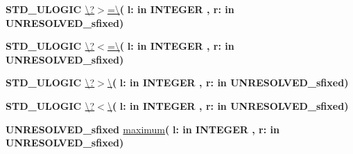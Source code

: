 \begin{DoxyCompactItemize}
\item 
{\bfseries {\bfseries \textcolor{comment}{S\+T\+D\+\_\+\+U\+L\+O\+G\+I\+C}\textcolor{vhdlchar}{ }}} \hyperlink{class__fixed__pkg_a3adee8c12e5c0bb76fc3e1a493284a27}{\textbackslash{}?$>$=\textbackslash{}}{\bfseries  ( }{\bfseries \textcolor{vhdlchar}{l\+: }\textcolor{stringliteral}{in }{\bfseries \textcolor{comment}{I\+N\+T\+E\+G\+E\+R}\textcolor{vhdlchar}{ }}}{\bfseries  , \textcolor{vhdlchar}{r\+: }\textcolor{stringliteral}{in }\textcolor{vhdlchar}{U\+N\+R\+E\+S\+O\+L\+V\+E\+D\+\_\+sfixed}}{\bfseries  )} 
\item 
{\bfseries {\bfseries \textcolor{comment}{S\+T\+D\+\_\+\+U\+L\+O\+G\+I\+C}\textcolor{vhdlchar}{ }}} \hyperlink{class__fixed__pkg_a271da29f659a2bc9480dbd29d7727913}{\textbackslash{}?$<$=\textbackslash{}}{\bfseries  ( }{\bfseries \textcolor{vhdlchar}{l\+: }\textcolor{stringliteral}{in }{\bfseries \textcolor{comment}{I\+N\+T\+E\+G\+E\+R}\textcolor{vhdlchar}{ }}}{\bfseries  , \textcolor{vhdlchar}{r\+: }\textcolor{stringliteral}{in }\textcolor{vhdlchar}{U\+N\+R\+E\+S\+O\+L\+V\+E\+D\+\_\+sfixed}}{\bfseries  )} 
\item 
{\bfseries {\bfseries \textcolor{comment}{S\+T\+D\+\_\+\+U\+L\+O\+G\+I\+C}\textcolor{vhdlchar}{ }}} \hyperlink{class__fixed__pkg_a9e6b6b8c2c14da978e6f70cb6e85e6dc}{\textbackslash{}?$>$\textbackslash{}}{\bfseries  ( }{\bfseries \textcolor{vhdlchar}{l\+: }\textcolor{stringliteral}{in }{\bfseries \textcolor{comment}{I\+N\+T\+E\+G\+E\+R}\textcolor{vhdlchar}{ }}}{\bfseries  , \textcolor{vhdlchar}{r\+: }\textcolor{stringliteral}{in }\textcolor{vhdlchar}{U\+N\+R\+E\+S\+O\+L\+V\+E\+D\+\_\+sfixed}}{\bfseries  )} 
\item 
{\bfseries {\bfseries \textcolor{comment}{S\+T\+D\+\_\+\+U\+L\+O\+G\+I\+C}\textcolor{vhdlchar}{ }}} \hyperlink{class__fixed__pkg_a7e98e66a4a282c529968f69f70dd16ad}{\textbackslash{}?$<$\textbackslash{}}{\bfseries  ( }{\bfseries \textcolor{vhdlchar}{l\+: }\textcolor{stringliteral}{in }{\bfseries \textcolor{comment}{I\+N\+T\+E\+G\+E\+R}\textcolor{vhdlchar}{ }}}{\bfseries  , \textcolor{vhdlchar}{r\+: }\textcolor{stringliteral}{in }\textcolor{vhdlchar}{U\+N\+R\+E\+S\+O\+L\+V\+E\+D\+\_\+sfixed}}{\bfseries  )} 
\item 
{\bfseries {\bfseries \textcolor{vhdlchar}{U\+N\+R\+E\+S\+O\+L\+V\+E\+D\+\_\+sfixed}\textcolor{vhdlchar}{ }}} \hyperlink{class__fixed__pkg_a427ed4c94126ca4966f81712b325a314}{maximum}{\bfseries  ( }{\bfseries \textcolor{vhdlchar}{l\+: }\textcolor{stringliteral}{in }{\bfseries \textcolor{comment}{I\+N\+T\+E\+G\+E\+R}\textcolor{vhdlchar}{ }}}{\bfseries  , \textcolor{vhdlchar}{r\+: }\textcolor{stringliteral}{in }\textcolor{vhdlchar}{U\+N\+R\+E\+S\+O\+L\+V\+E\+D\+\_\+sfixed}}{\bfseries  )} 

\end{DoxyCompactItemize}
